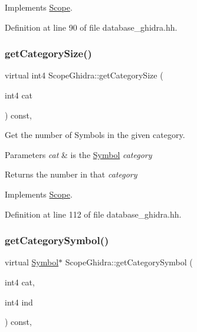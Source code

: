 Implements \mbox{\hyperlink{class_scope_a3395b6194a59515caa1ede92fd6ac511}{Scope}}.



Definition at line 90 of file database\+\_\+ghidra.\+hh.

\mbox{\label{class_scope_ghidra_a4c6c26ca7dd639659313e8fe86d798c8}} 
\subsubsection{\texorpdfstring{getCategorySize()}{getCategorySize()}}
{\footnotesize\ttfamily virtual int4 Scope\+Ghidra\+::get\+Category\+Size (\begin{DoxyParamCaption}\item[{int4}]{cat }\end{DoxyParamCaption}) const\hspace{0.3cm}{\ttfamily [inline]}, {\ttfamily [virtual]}}



Get the number of Symbols in the given category. 


\begin{DoxyParams}{Parameters}
{\em cat} & is the \mbox{\hyperlink{class_symbol}{Symbol}} {\itshape category} \\
\hline
\end{DoxyParams}
\begin{DoxyReturn}{Returns}
the number in that {\itshape category} 
\end{DoxyReturn}


Implements \mbox{\hyperlink{class_scope_a909e15a7a96c9b402855b56b6bfdbd9f}{Scope}}.



Definition at line 112 of file database\+\_\+ghidra.\+hh.

\mbox{\label{class_scope_ghidra_aa3b3e331ed319e74af4a5927f7e70660}} 
\subsubsection{\texorpdfstring{getCategorySymbol()}{getCategorySymbol()}}
{\footnotesize\ttfamily virtual \mbox{\hyperlink{class_symbol}{Symbol}}$\ast$ Scope\+Ghidra\+::get\+Category\+Symbol (\begin{DoxyParamCaption}\item[{int4}]{cat,  }\item[{int4}]{ind }\end{DoxyParamCaption}) const\hspace{0.3cm}{\ttfamily [inline]}, {\ttfamily [virtual]}}




